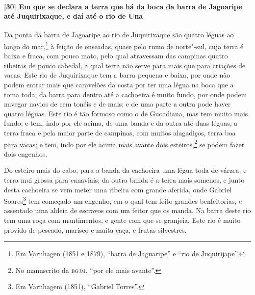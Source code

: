 \paragraph{[30] Em que se declara a terra que há da boca da barra de Jagoaripe até
Juquirixaque, e daí até o rio de Una}\quad
Da ponta da barra de Jagoaripe ao rio de Juquirixaque são quatro léguas ao longo do
mar,\footnote{ Em Varnhagen (1851 e 1879), ``barra de Jaguaripe'' e ``rio de
Juquirijape''.} à feição de enseadas, quase pelo rumo de norte"-sul, cuja terra é baixa e
fraca, com pouco mato, pelo qual atravessam das campinas quatro ribeiras de pouco cabedal,
a qual terra não serve para mais que para criações de vacas. Este rio de Juquirixaque tem
a barra pequena e baixa, por onde não podem entrar mais que caravelões da costa por ter
uma légua na boca que a toma toda; da barra para dentro até a cachoeira é muito fundo, por
onde podem navegar navios de cem tonéis e de mais; e de uma parte a outra pode haver
quatro léguas. Este rio é tão formoso como o de Guoadiana, mas tem muito mais fundo; e
tem, indo por ele acima, de uma banda e da outra até duas léguas, a terra fraca e pela
maior parte de campinas, com muitos alagadiços, terra boa para vacas; e tem, indo por ele
acima mais avante dois esteiros,\footnote{ No manuscrito da \textsc{bgjm}, ``por ele mais
avante''.} se podem fazer dois engenhos.

Do esteiro mais do cabo, para a banda da cachoeira uma légua toda de várzea, e terra mui
grossa para canaviais; da outra banda é a terra mais somenos, e junto desta cachoeira se
vem meter uma ribeira com grande aferida, onde Gabriel Soares\footnote{ Em Varnhagem
(1851), ``Gabriel Torres''.} tem começado um engenho, em o qual tem feito grandes
benfeitorias, e assentado uma aldeia de escravos com um feitor que os manda. Na barra
deste rio tem uma roça com mantimentos, e gente com que se granjeia. Este rio é muito
provido de pescado, marisco e muita caça, e frutas silvestres.

